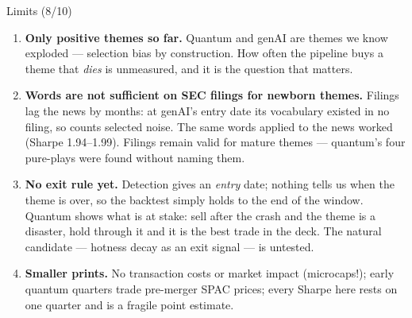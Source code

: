 \documentclass[10pt,aspectratio=169]{beamer}
\newcommand{\bd}[1]{\textcolor{bad}{#1}}
\begin{document}
\begin{frame}[t]{Limits (8/10)}
  \footnotesize
  \begin{enumerate}\itemsep 7pt
    \item \bd{\textbf{Only positive themes so far.}} Quantum and genAI are themes we know
      exploded --- selection bias by construction. How often the pipeline buys a theme that
      \emph{dies} is unmeasured, and it is the question that matters.
    \item \bd{\textbf{Words are not sufficient on SEC filings for newborn themes.}}
      Filings lag the news by months: at genAI's entry date its vocabulary existed in no
      filing, so counts selected noise. The same words applied to the news worked
      (Sharpe 1.94--1.99). Filings remain valid for mature themes --- quantum's four
      pure-plays were found without naming them.
    \item \bd{\textbf{No exit rule yet.}} Detection gives an \emph{entry} date; nothing tells
      us when the theme is over, so the backtest simply holds to the end of the window.
      Quantum shows what is at stake: sell after the crash and the theme is a disaster, hold
      through it and it is the best trade in the deck. The natural candidate --- hotness
      decay as an exit signal --- is untested.
    \item \textbf{Smaller prints.} No transaction costs or market impact (microcaps!);
      early quantum quarters trade pre-merger SPAC prices; every Sharpe here rests on one
      quarter and is a fragile point estimate.
  \end{enumerate}
\end{frame}
\end{document}
